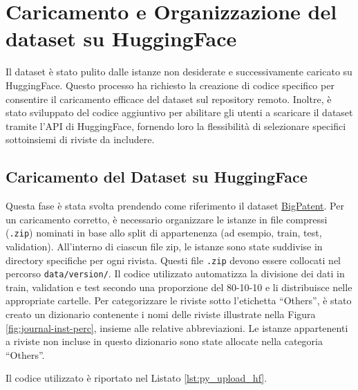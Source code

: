 \documentclass[12pt,a4paper,twoside,openright]{book}
\begin{document}
\section{Caricamento e Organizzazione del dataset su HuggingFace}
Il dataset è stato pulito dalle istanze non desiderate e successivamente caricato su HuggingFace.
Questo processo ha richiesto la creazione di codice specifico per consentire il caricamento efficace del dataset sul repository remoto. Inoltre, è stato sviluppato del codice aggiuntivo per abilitare gli utenti a scaricare il dataset tramite l'API di HuggingFace, fornendo loro la flessibilità di selezionare specifici sottoinsiemi di riviste da includere.

\subsection{Caricamento del Dataset su HuggingFace}
Questa fase è stata svolta prendendo come riferimento il dataset \href{https://huggingface.co/datasets/big_patent}{BigPatent}. Per un caricamento corretto, è necessario organizzare le istanze in file compressi (\texttt{.zip}) nominati in base allo split di appartenenza (ad esempio, train, test, validation). All'interno di ciascun file zip, le istanze sono state suddivise in directory specifiche per ogni rivista. Questi file \texttt{.zip} devono essere collocati nel percorso \texttt{data/version/}. Il codice utilizzato automatizza la divisione dei dati in train, validation e test secondo una proporzione del 80-10-10 e li distribuisce nelle appropriate cartelle.
Per categorizzare le riviste sotto l'etichetta ``Others'', è stato creato un dizionario contenente i nomi delle riviste illustrate nella Figura \ref{fig:journal-inst-perc}, insieme alle relative abbreviazioni. Le istanze appartenenti a riviste non incluse in questo dizionario sono state allocate nella categoria ``Others''.

Il codice utilizzato è riportato nel Listato \ref{lst:py_upload_hf}.
\end{document}
